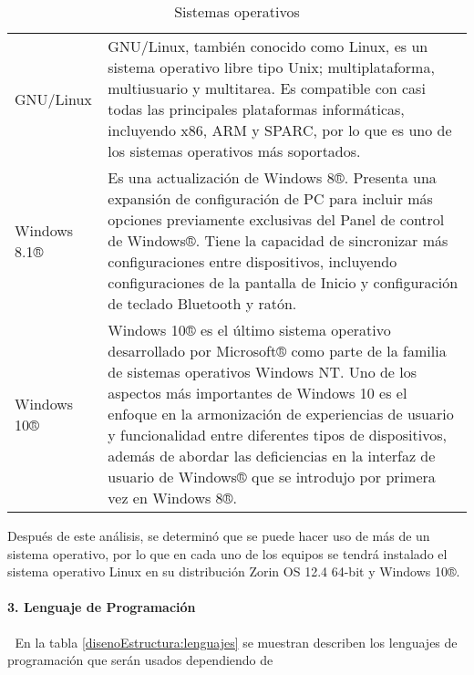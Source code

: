 \begin{table}[htbp]
	\begin{center}
		\begin{tabular}{|p{3cm}|p{10cm}|}
			\hline
			\thead{Nombre}&\thead{Descripción}\\
			\hline
			\hline
			GNU/Linux &  GNU/Linux, también conocido como Linux, es un sistema operativo libre tipo Unix; multiplataforma, multiusuario y multitarea. Es compatible con casi todas las principales plataformas informáticas, incluyendo x86, ARM y SPARC, por lo que es uno de los sistemas operativos más soportados.\\
			\hline
			Windows 8.1® & Es una actualización de Windows 8®. Presenta una expansión de configuración de PC para incluir más opciones previamente exclusivas del  Panel de control de Windows®. Tiene la capacidad de sincronizar más configuraciones entre dispositivos, incluyendo configuraciones de la pantalla de Inicio y configuración de teclado Bluetooth y ratón.\\
			\hline
			Windows 10® & Windows 10® es el último sistema operativo desarrollado por Microsoft®  como parte de la familia de sistemas operativos Windows NT. Uno de los aspectos más importantes de Windows 10 es el enfoque en la armonización de experiencias de usuario y funcionalidad entre diferentes tipos de dispositivos, además de abordar las deficiencias en la interfaz de usuario de Windows®  que se introdujo por primera vez en Windows 8®.\\
			\hline
		\end{tabular}
		\caption{Sistemas operativos}
		\label{disenoEstructura:SO}
	\end{center}
\end{table}

Después de este análisis, se determinó que se puede hacer uso de más de un sistema operativo, por lo que en cada uno de los equipos se tendrá instalado el sistema operativo Linux en su distribución Zorin OS 12.4 64-bit y Windows 10®.

\paragraph{3. Lenguaje de Programación} \textcolor{White}{.} \newline
En la tabla \ref{disenoEstructura:lenguajes} se muestran describen los lenguajes de programación que serán usados dependiendo de \\



